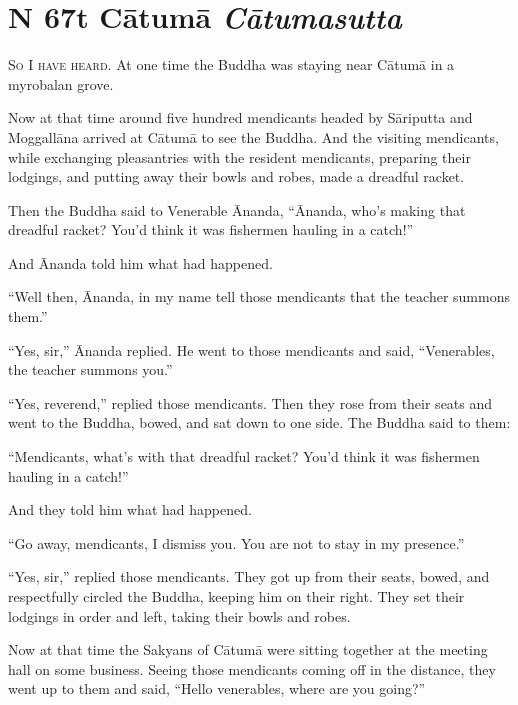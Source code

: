 \documentclass[12pt,openany]{book}%
\newcommand*{\suttatitleacronym}[1]{\smaller[2]{#1}\vspace*{.3em}}
\newcommand*{\suttatitletranslation}[1]{\linebreak{#1}}
\newcommand*{\suttatitleroot}[1]{\linebreak\smaller[2]\itshape{#1}}
\newcommand*{\tocacronym}[1]{\hspace*{-3.3em}{#1}\quad}
\newcommand*{\toctranslation}[1]{#1}
\newcommand*{\tocroot}[1]{(\textit{#1})}
\newcommand*{\scevam}[1]{\textsc{#1}}
\begin{document}
%
\section*{{\suttatitleacronym MN 67}{\suttatitletranslation At Cātumā }{\suttatitleroot Cātumasutta}}
\addcontentsline{toc}{section}{\tocacronym{MN 67} \toctranslation{At Cātumā } \tocroot{Cātumasutta}}

\scevam{So I have heard. }At one time the Buddha was staying near \textsanskrit{Cātumā} in a myrobalan grove. 

Now at that time around five hundred mendicants headed by \textsanskrit{Sāriputta} and \textsanskrit{Moggallāna} arrived at \textsanskrit{Cātumā} to see the Buddha. And the visiting mendicants, while exchanging pleasantries with the resident mendicants, preparing their lodgings, and putting away their bowls and robes, made a dreadful racket. 

Then the Buddha said to Venerable Ānanda, “Ānanda, who’s making that dreadful racket? You’d think it was fishermen hauling in a catch!” 

And Ānanda told him what had happened. 

“Well then, Ānanda, in my name tell those mendicants that the teacher summons them.” 

“Yes, sir,” Ānanda replied. He went to those mendicants and said, “Venerables, the teacher summons you.” 

“Yes, reverend,” replied those mendicants. Then they rose from their seats and went to the Buddha, bowed, and sat down to one side. The Buddha said to them: 

“Mendicants, what’s with that dreadful racket? You’d think it was fishermen hauling in a catch!” 

And they told him what had happened. 

“Go away, mendicants, I dismiss you. You are not to stay in my presence.” 

“Yes, sir,” replied those mendicants. They got up from their seats, bowed, and respectfully circled the Buddha, keeping him on their right. They set their lodgings in order and left, taking their bowls and robes. 

Now at that time the Sakyans of \textsanskrit{Cātumā} were sitting together at the meeting hall on some business. Seeing those mendicants coming off in the distance, they went up to them and said, “Hello venerables, where are you going?” 
\end{document}
